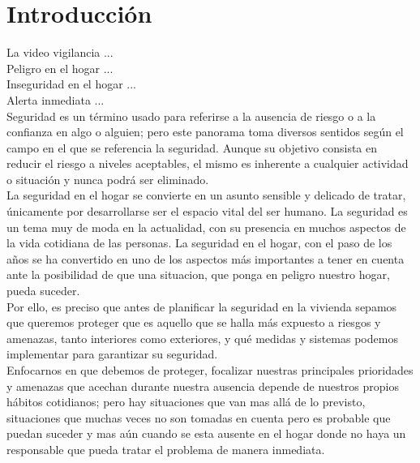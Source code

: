 \chapter{Introducción}


La video vigilancia ...\\

Peligro en el hogar ...\\

Inseguridad en el hogar ...\\

Alerta inmediata ...\\

Seguridad es un término usado para referirse a la ausencia de riesgo o a la confianza en algo o alguien; pero este panorama toma diversos sentidos según el campo en el que se referencia la seguridad. Aunque su objetivo consista en reducir el riesgo a niveles aceptables, el mismo es inherente a cualquier actividad o situación y nunca podrá ser eliminado.\\

La seguridad en el hogar se convierte en un asunto sensible y delicado de tratar, únicamente por desarrollarse ser el espacio vital del ser humano. La seguridad es un tema muy de moda en la actualidad, con su presencia en muchos aspectos de la vida cotidiana de las personas. La seguridad en el hogar, con el paso de los años se ha convertido en  uno de los aspectos más importantes a tener en cuenta ante la posibilidad de que una situacion, que ponga en  peligro nuestro hogar, pueda suceder.\\

Por ello, es preciso que antes de planificar la seguridad en la vivienda sepamos que queremos proteger que es aquello que se halla más expuesto a riesgos y amenazas, tanto interiores como exteriores,  y qué medidas y sistemas podemos implementar para garantizar su seguridad. \\

Enfocarnos en que debemos de proteger, focalizar nuestras principales prioridades y amenazas que acechan durante nuestra ausencia depende de nuestros propios hábitos cotidianos; pero hay situaciones que van mas allá de lo previsto, situaciones que muchas veces no son tomadas en cuenta pero es probable que puedan suceder y mas aún cuando se esta ausente en el hogar donde no haya un responsable que pueda tratar el problema de manera inmediata.\\

